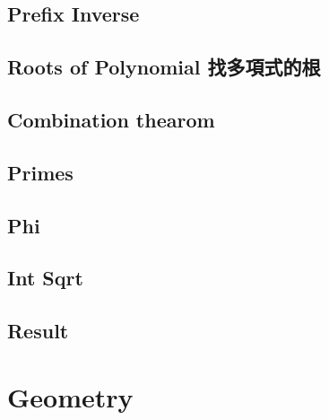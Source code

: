 \documentclass[a4paper,10pt,twocolumn,oneside]{article}
\begin{document}
\subsection{Prefix Inverse}


\subsection{Roots of Polynomial 找多項式的根}


\subsection{Combination thearom}


% 

%

\subsection{Primes}


\subsection{Phi}


\subsection{Int Sqrt}


\subsection{Result}


\section{Geometry}

% 
\end{document}
